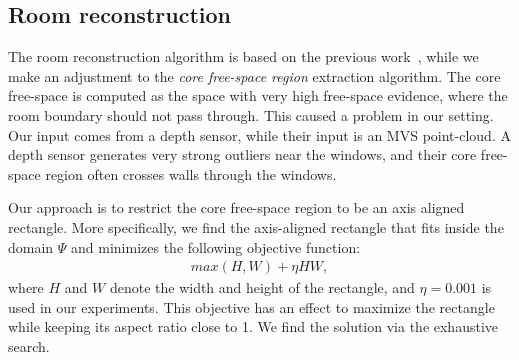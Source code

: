 \subsection{Room reconstruction}
The room reconstruction algorithm is based on the previous
work~\cite{Cabral2014}, while we make an adjustment to the {\em core
free-space region} extraction algorithm. The core free-space is computed
as the space with very high free-space evidence, where the room boundary
should not pass through. This caused a problem in our setting. Our
input comes from a depth sensor, while their input is an MVS
point-cloud. A depth sensor generates very strong outliers near the
windows, and their core free-space region often crosses walls through the
windows.

Our approach is to restrict the core free-space region to be an axis
aligned rectangle. More specifically, we find the axis-aligned rectangle
that fits inside the domain $\Psi$ and minimizes the following objective
function:
\begin{eqnarray*}
 max(H, W) + \eta H W,
\end{eqnarray*}
where $H$ and $W$ denote the width and height of the rectangle, and
$\eta=0.001$ is used in our experiments.  This objective has an effect
to maximize the rectangle while keeping its aspect ratio close to 1. We
find the solution via the exhaustive search.





